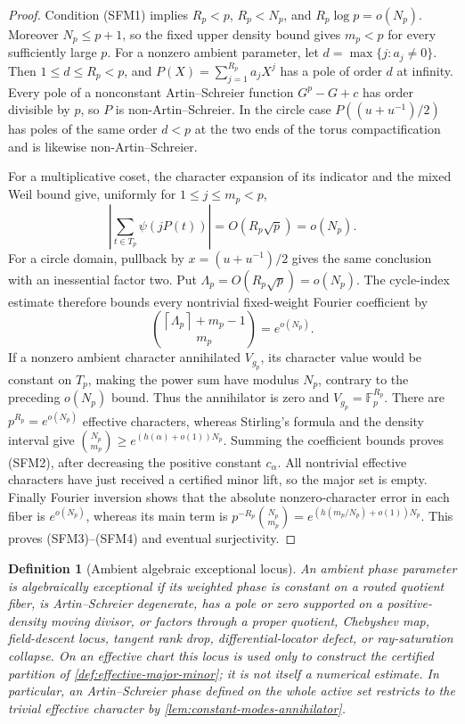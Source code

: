 \documentclass[12pt,a4paper]{amsart}
\numberwithin{equation}{section}
\newtheorem{definition}[definition]{Definition}
\theoremstyle{remark}
\newcommand{\F}{\mathbb F}
\newcommand{\ceil}[1]{\left\lceil #1\right\rceil}
\begin{document}
\begin{proof}
Condition \textup{(SFM1)} implies \(R_p<p\), \(R_p<N_p\), and
\(R_p\log p=o(N_p)\).  Moreover \(N_p\le p+1\), so the fixed upper
density bound gives \(m_p<p\) for every sufficiently large \(p\).
For a nonzero ambient parameter, let
\(d=\max\{j:a_j\ne0\}\).  Then \(1\le d\le R_p<p\), and
\(P(X)=\sum_{j=1}^{R_p}a_jX^j\) has a pole of order \(d\) at infinity.
Every pole of a nonconstant Artin--Schreier function \(G^p-G+c\) has
order divisible by \(p\), so \(P\) is non-Artin--Schreier.  In the circle
case \(P((u+u^{-1})/2)\) has poles of the same order \(d<p\) at the two
ends of the torus compactification and is likewise non-Artin--Schreier.

For a multiplicative coset, the character expansion of its indicator and
the mixed Weil bound give, uniformly for \(1\le j\le m_p<p\),
\[
 \left|\sum_{t\in T_p}\psi(jP(t))\right|=O(R_p\sqrt p)=o(N_p).
\]
For a circle domain, pullback by
\(x=(u+u^{-1})/2\) gives the same conclusion with an inessential factor
two.  Put \(\Lambda_p=O(R_p\sqrt p)=o(N_p)\).  The cycle-index estimate
therefore bounds every nontrivial fixed-weight Fourier coefficient by
\[
 \binom{\ceil{\Lambda_p}+m_p-1}{m_p}=e^{o(N_p)}.
\]
If a nonzero ambient character annihilated \(V_{g_p}\), its character
value would be constant on \(T_p\), making the power sum have modulus
\(N_p\), contrary to the preceding \(o(N_p)\) bound.  Thus the
annihilator is zero and \(V_{g_p}=\F_p^{R_p}\).  There are
\(p^{R_p}=e^{o(N_p)}\) effective characters, whereas
Stirling's formula and the density interval give
\(\binom{N_p}{m_p}\ge
e^{(h(\alpha)+o(1))N_p}\).  Summing the coefficient bounds proves
\textup{(SFM2)}, after decreasing the positive constant
\(c_\alpha\).  All nontrivial effective characters have just received a
certified minor lift, so the major set is empty.  Finally
Fourier inversion shows that the absolute nonzero-character error in each
fiber is \(e^{o(N_p)}\), whereas its main term is
\(p^{-R_p}\binom{N_p}{m_p}=e^{(h(m_p/N_p)+o(1))N_p}\).
This proves \textup{(SFM3)}--\textup{(SFM4)} and eventual surjectivity.
\end{proof}

\begin{definition}[Ambient algebraic exceptional locus]\label{def:major-arc}
An ambient phase parameter is \emph{algebraically exceptional} if its
weighted phase is constant on a routed quotient fiber, is Artin--Schreier
degenerate, has a pole or zero supported on a positive-density moving
divisor, or factors through a proper quotient, Chebyshev map,
field-descent locus, tangent rank drop, differential-locator defect, or
ray-saturation collapse.  On an effective chart this locus is used only
to construct the certified partition of
\cref{def:effective-major-minor}; it is not itself a numerical estimate.
In particular, an Artin--Schreier phase defined on the whole active set
restricts to the trivial effective character by
\cref{lem:constant-modes-annihilator}.
\end{definition}
\end{document}
